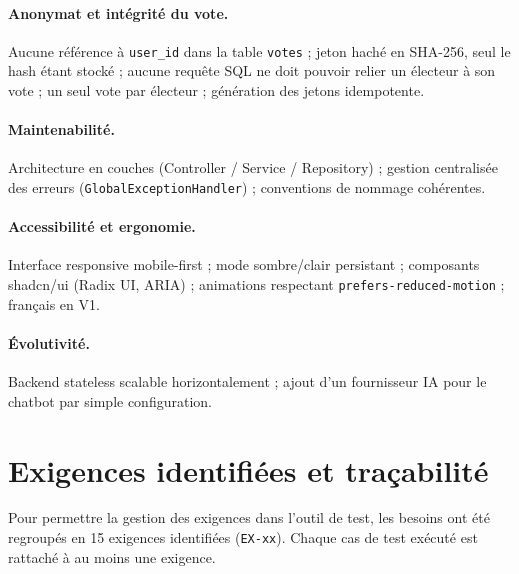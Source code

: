 \documentclass[12pt,a4paper]{report}
\begin{document}
\paragraph{Anonymat et intégrité du vote.} Aucune référence à \texttt{user\_id} dans la table \texttt{votes} ; jeton haché en SHA-256, seul le hash étant stocké ; aucune requête SQL ne doit pouvoir relier un électeur à son vote ; un seul vote par électeur ; génération des jetons idempotente.

\paragraph{Maintenabilité.} Architecture en couches (Controller / Service / Repository) ; gestion centralisée des erreurs (\texttt{GlobalExceptionHandler}) ; conventions de nommage cohérentes.

\paragraph{Accessibilité et ergonomie.} Interface responsive mobile-first ; mode sombre/clair persistant ; composants shadcn/ui (Radix UI, ARIA) ; animations respectant \texttt{prefers-reduced-motion} ; français en V1.

\paragraph{Évolutivité.} Backend stateless scalable horizontalement ; ajout d'un fournisseur IA pour le chatbot par simple configuration.

\section{Exigences identifiées et traçabilité}
Pour permettre la gestion des exigences dans l'outil de test, les besoins ont été regroupés en 15 exigences identifiées (\texttt{EX-xx}). Chaque cas de test exécuté est rattaché à au moins une exigence.
\end{document}
